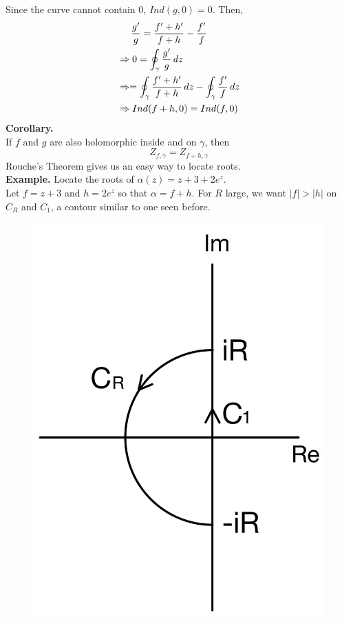 \documentclass[11pt]{article}
\begin{document}
Since the curve cannot contain 0, $Ind(g, 0) = 0$. Then, 
\begin{align*}
&\hspace{5mm} \frac{g'}{g} = \frac{f' + h'}{f + h} - \frac{f'}{f} \\
&\Rightarrow 0 = \oint_\gamma \frac{g'}{g} \, dz \\ 
&\Rightarrow = \oint_\gamma \frac{f' + h'}{f + h} \, dz - \oint_\gamma \frac{f'}{f} \, dz \\
&\Rightarrow Ind(f + h, 0) = Ind(f, 0)
\end{align*}
\newline
\textbf{Corollary.} \\
If $f$ and $g$ are also holomorphic inside and on $\gamma$, then 
$$ Z_{f, \gamma} = Z_{f + h, \gamma} $$
Rouche's Theorem gives us an easy way to locate roots. \\
\newline
\textbf{Example.} Locate the roots of $\alpha(z) = z + 3 + 2e^z$. \\
Let $f = z + 3$ and $h = 2e^z$ so that $\alpha = f + h$. For $R$ large, we want $|f| > |h|$ on $C_R$ and $C_1$, a contour similar to one seen before. 
\begin{figure}[H]
\includegraphics[scale = 0.15]{22_12}
\centering
\end{figure}
\end{document}
